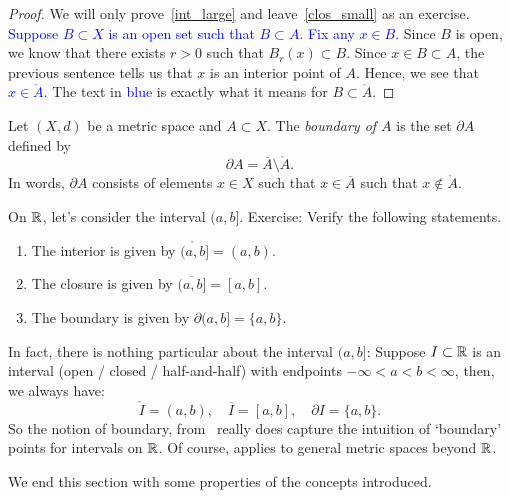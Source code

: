 \begin{proof}
	We will only prove~\ref{int_large} and leave~\ref{clos_small} as an exercise. \textcolor{blue}{Suppose $B\subset X$ is an open set such that $B\subset A$. Fix any $x\in B$.} Since $B$ is open, we know that there exists $r>0$ such that $B_r(x) \subset B$. Since $x\in B\subset A$, the previous sentence tells us that $x$ is an interior point of $A$. Hence, we see that \textcolor{blue}{$x\in \mathring{A}$.} The text in \textcolor{blue}{blue} is exactly what it means for $B\subset \mathring{A}$.
\end{proof}
\begin{defn}[Boundary]
\label{defn:boundary}
Let $(X,d)$ be a metric space and $A\subset X$. The \textit{boundary of $A$} is the set $\partial A$ defined by
\[
\partial A = \overline{A} \setminus \mathring{A}.
\]
In words, $\partial A$ consists of elements $x\in X$ such that $x\in \overline{A}$ such that $x\notin \mathring{A}$.
\end{defn}
\begin{eg}
On $\mathbb{R}$, let's consider the interval $(a,b]$. Exercise: Verify the following statements.
\begin{enumerate}
	\item The interior is given by $\mathring{(a,b]} = (a,b)$.
	\item The closure is given by $\overline{(a,b]} = [a,b]$.
	\item The boundary is given by $\partial(a,b] = \{a,b\}$.
\end{enumerate}
In fact, there is nothing particular about the interval $(a,b]$: Suppose $I\subset \mathbb{R}$ is an interval (open / closed / half-and-half) with endpoints $-\infty < a < b < \infty$, then, we always have:
\[
\mathring{I} = (a,b),\quad \overline{I} = [a,b],\quad \partial I = \{a,b\}.
\]
So the notion of boundary, from~ really does capture the intuition of `boundary' points for intervals on $\mathbb{R}$. Of course,  applies to general metric spaces beyond $\mathbb{R}$.
\end{eg}
We end this section with some properties of the concepts introduced.
